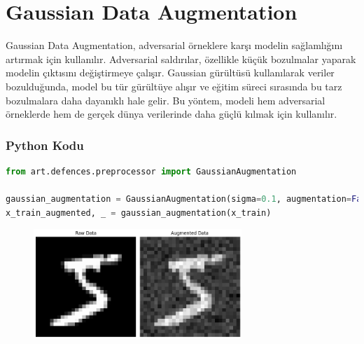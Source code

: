 \section{Gaussian Data Augmentation}

Gaussian Data Augmentation, adversarial örneklere karşı modelin sağlamlığını artırmak için kullanılır. Adversarial saldırılar, özellikle küçük bozulmalar yaparak modelin çıktısını değiştirmeye çalışır. Gaussian gürültüsü kullanılarak veriler bozulduğunda, model bu tür gürültüye alışır ve eğitim süreci sırasında bu tarz bozulmalara daha dayanıklı hale gelir. Bu yöntem, modeli hem adversarial örneklerde hem de gerçek dünya verilerinde daha güçlü kılmak için kullanılır.

\subsubsection{Python Kodu}

\begin{lstlisting}[language=Python]
from art.defences.preprocessor import GaussianAugmentation

gaussian_augmentation = GaussianAugmentation(sigma=0.1, augmentation=False, ratio=1.0)
x_train_augmented, _ = gaussian_augmentation(x_train)
\end{lstlisting}

\begin{figure}[h]
    \centering
    \includegraphics[width=0.7\textwidth]{images/gaussian_data_augmentation_example.png}
    \caption{}
\end{figure}

\newpage